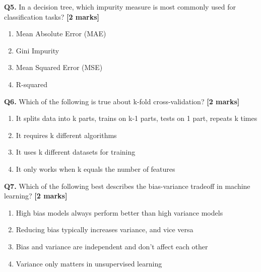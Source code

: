 \documentclass{article}
\begin{document}
\vspace{0.3cm}

\textbf{Q5.} In a decision tree, which impurity measure is most commonly used for classification tasks? \textbf{[2 marks]}

\begin{enumerate}[label=(\Alph*)]

  \item Mean Absolute Error (MAE)

  \item Gini Impurity

  \item Mean Squared Error (MSE)

  \item R-squared

\end{enumerate}

\vspace{0.3cm}

\textbf{Q6.} Which of the following is true about k-fold cross-validation? \textbf{[2 marks]}

\begin{enumerate}[label=(\Alph*)]

  \item It splits data into k parts, trains on k-1 parts, tests on 1 part, repeats k times

  \item It requires k different algorithms

  \item It uses k different datasets for training

  \item It only works when k equals the number of features

\end{enumerate}

\vspace{0.3cm}

\textbf{Q7.} Which of the following best describes the bias-variance tradeoff in machine learning? \textbf{[2 marks]}

\begin{enumerate}[label=(\Alph*)]

  \item High bias models always perform better than high variance models

  \item Reducing bias typically increases variance, and vice versa

  \item Bias and variance are independent and don't affect each other

  \item Variance only matters in unsupervised learning

\end{enumerate}
\end{document}
